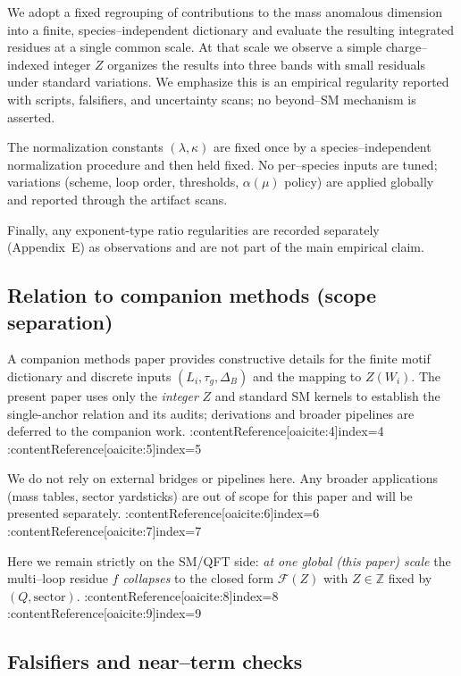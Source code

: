 \documentclass[epjc3]{svjour3}
\begin{document}
We adopt a fixed regrouping of contributions to the mass anomalous dimension into a finite, species–independent dictionary and evaluate the resulting integrated residues at a single common scale. At that scale we observe a simple charge–indexed integer $Z$ organizes the results into three bands with small residuals under standard variations. We emphasize this is an empirical regularity reported with scripts, falsifiers, and uncertainty scans; no beyond–SM mechanism is asserted.

The normalization constants $(\lambda,\kappa)$ are fixed once by a species–independent normalization procedure and then held fixed. No per–species inputs are tuned; variations (scheme, loop order, thresholds, $\alpha(\mu)$ policy) are applied globally and reported through the artifact scans.

Finally, any exponent-type ratio regularities are recorded separately (Appendix~E) as observations and are not part of the main empirical claim.

\subsection*{Relation to companion methods (scope separation)}

A companion methods paper provides constructive details for the finite motif dictionary and discrete inputs $(L_i,\tau_g,\Delta_B)$ and the mapping to $Z(W_i)$. The present paper uses only the \emph{integer} $Z$ and standard SM kernels to establish the single-anchor relation and its audits; derivations and broader pipelines are deferred to the companion work. :contentReference[oaicite:4]{index=4} :contentReference[oaicite:5]{index=5}

We do not rely on external bridges or pipelines here. Any broader applications (mass tables, sector yardsticks) are out of scope for this paper and will be presented separately. :contentReference[oaicite:6]{index=6} :contentReference[oaicite:7]{index=7}

Here we remain strictly on the SM/QFT side: \emph{at one global (this paper) scale} the multi–loop residue $f$ \emph{collapses} to the closed form $\mathcal F(Z)$ with $Z\in\mathbb Z$ fixed by $(Q,\text{sector})$. :contentReference[oaicite:8]{index=8} :contentReference[oaicite:9]{index=9}

\subsection*{Falsifiers and near–term checks}
\end{document}
